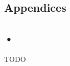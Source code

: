 \documentclass[../thesis.tex]{subfiles}
\begin{document}
\graphicspath{{../}}

\begin{appendices}

\makeatletter
{}
\makeatother

\part*{Appendices}


\chapter{•}


TODO

\end{appendices}

\clearpage
\end{document}
